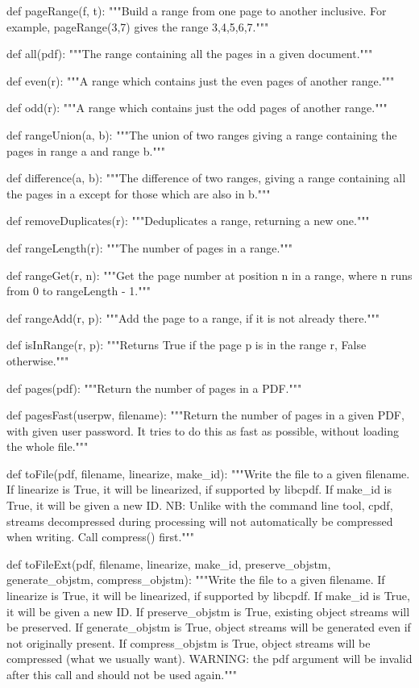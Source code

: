 def pageRange(f, t):
    """Build a range from one page to another inclusive. For example,
    pageRange(3,7) gives the range 3,4,5,6,7."""

def all(pdf):
    """The range containing all the pages in a given document."""

def even(r):
    """A range which contains just the even pages of another range."""

def odd(r):
    """A range which contains just the odd pages of another range."""

def rangeUnion(a, b):
    """The union of two ranges giving a range containing
    the pages in range a and range b."""

def difference(a, b):
    """The difference of two ranges, giving a range
    containing all the pages in a except for those which are also in b."""

def removeDuplicates(r):
    """Deduplicates a range, returning a new one."""

def rangeLength(r):
    """The number of pages in a range."""

def rangeGet(r, n):
    """Get the page number at position n in a range, where
    n runs from 0 to rangeLength - 1."""

def rangeAdd(r, p):
    """Add the page to a range, if it is not already
    there."""

def isInRange(r, p):
    """Returns True if the page p is in the range r, False otherwise."""

def pages(pdf):
    """Return the number of pages in a PDF."""

def pagesFast(userpw, filename):
    """Return the number of pages in a given PDF, with given user password. It
    tries to do this as fast as possible, without loading the whole file."""

def toFile(pdf, filename, linearize, make_id):
    """Write the file to a given filename. If linearize is True, it will be
    linearized, if supported by libcpdf. If make_id is True, it will be given a
    new ID. NB: Unlike with the command line tool, cpdf, streams decompressed
    during processing will not automatically be compressed when writing. Call
    compress() first."""

def toFileExt(pdf, filename, linearize, make_id, preserve_objstm,
              generate_objstm, compress_objstm):
    """Write the file to a given filename. If linearize is True, it will be
    linearized, if supported by libcpdf. If make_id is True, it will be given a
    new ID.  If preserve_objstm is True, existing object streams will be
    preserved. If generate_objstm is True, object streams will be generated
    even if not originally present. If compress_objstm is True, object streams
    will be compressed (what we usually want). WARNING: the pdf argument will
    be invalid after this call and should not be used again."""

